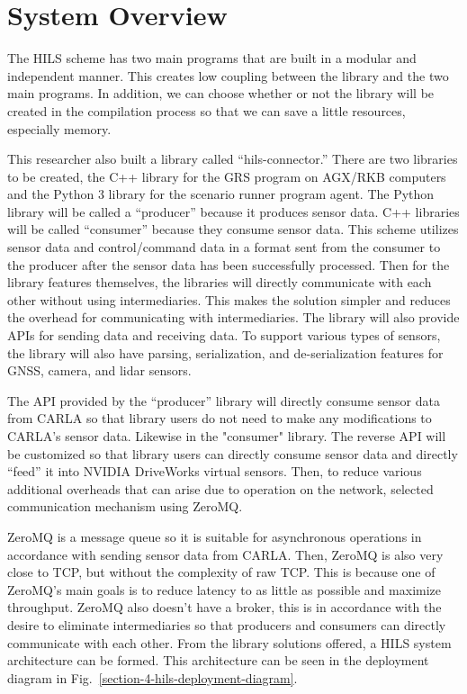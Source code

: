 \section{System Overview}

The HILS scheme has two main programs that are built in a modular and
independent manner. This creates low coupling between the library and the two
main programs. In addition, we can choose whether or not the library will be
created in the compilation process so that we can save a little resources,
especially memory.

This researcher also built a library called ``hils-connector.'' There are two
libraries to be created, the C++ library for the GRS program on AGX/RKB
computers and the Python 3 library for the scenario runner program agent. The
Python library will be called a ``producer'' because it produces sensor data. C++
libraries will be called ``consumer'' because they consume sensor data. This
scheme utilizes sensor data and control/command data in a format sent from the
consumer to the producer after the sensor data has been successfully processed.
Then for the library features themselves, the libraries will directly
communicate with each other without using intermediaries. This makes the
solution simpler and reduces the overhead for communicating with intermediaries.
The library will also provide APIs for sending data and receiving data. To
support various types of sensors, the library will also have parsing,
serialization, and de-serialization features for GNSS, camera, and lidar
sensors.

The API provided by the ``producer'' library will directly consume sensor data
from CARLA so that library users do not need to make any modifications to
CARLA's sensor data. Likewise in the "consumer" library. The reverse API will be
customized so that library users can directly consume sensor data and directly
``feed'' it into NVIDIA DriveWorks virtual sensors. Then, to reduce various
additional overheads that can arise due to operation on the network, selected
communication mechanism using ZeroMQ.

ZeroMQ is a message queue so it is suitable for asynchronous operations in
accordance with sending sensor data from CARLA. Then, ZeroMQ is also very close
to TCP, but without the complexity of raw TCP. This is because one of ZeroMQ's
main goals is to reduce latency to as little as possible and maximize
throughput. ZeroMQ also doesn't have a broker, this is in accordance with the
desire to eliminate intermediaries so that producers and consumers can directly
communicate with each other. From the library solutions offered, a HILS system
architecture can be formed. This architecture can be seen in the deployment
diagram in Fig.~\ref{section-4-hils-deployment-diagram}.

